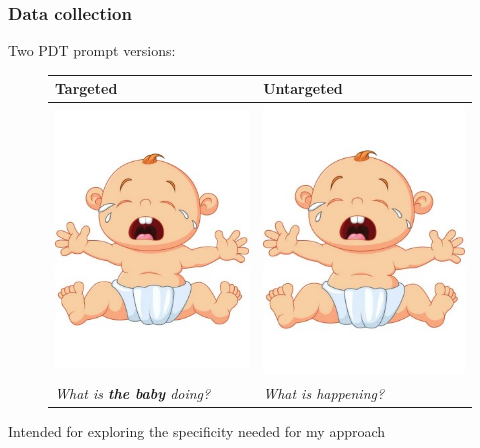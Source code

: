 \documentclass[handout,xcolor={dvipsnames}]{beamer}
\begin{document}
\begin{frame}
\frametitle{Data collection}

Two PDT prompt versions:
\begin{figure}[htb!]
\begin{center}
\begin{tabular}{|C{50mm}|C{50mm}|}
\hline
\textbf{Targeted} & \textbf{Untargeted} \\
\hline
{\includegraphics[trim=0 50 0 50,clip,width=0.33\columnwidth]{figures/I10.jpg}} & {\includegraphics[trim=0 50 0 50,clip,width=0.33\columnwidth]{figures/I10.jpg}} \\
\hline
\textit{What is \textbf{the baby} doing?} & \textit{What is happening?} \\
\hline
\end{tabular}
\end{center}
\end{figure}

Intended for exploring the specificity needed for my approach

\end{frame}
\end{document}
